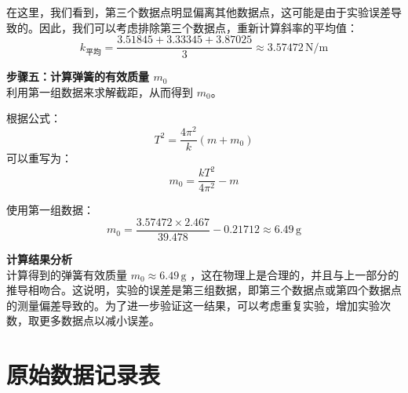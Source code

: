 \documentclass[zihao=5, UTF8]{article}
\theoremstyle{MyLineTheoremStyle} %
\theoremstyle{MyBlockTheoremStyle} %
\theoremstyle{MySubsubsectionStyle} %
\begin{document}
在这里，我们看到，第三个数据点明显偏离其他数据点，这可能是由于实验误差导致的。因此，我们可以考虑排除第三个数据点，重新计算斜率的平均值：
\[
k_{\text{平均}} = \frac{3.51845 + 3.33345 + 3.87025}{3} \approx 3.57472 \, \text{N/m}
\]

\textbf{步骤五：计算弹簧的有效质量 \( m_0 \)} \\
利用第一组数据来求解截距，从而得到 \( m_0 \)。

根据公式：
\[
T^2 = \frac{4\pi^2}{k}(m + m_0)
\]
可以重写为：
\[
m_0 = \frac{k T^2}{4\pi^2} - m
\]

使用第一组数据：
\[
m_0 = \frac{3.57472 \times 2.467}{39.478} - 0.21712 \approx  6.49 \, \text{g}
\]

\textbf{计算结果分析} \\
计算得到的弹簧有效质量 \( m_0 \approx 6.49 \, \text{g} \) ，这在物理上是合理的，并且与上一部分的推导相吻合。这说明，实验的误差是第三组数据，即第三个数据点或第四个数据点的测量偏差导致的。为了进一步验证这一结果，可以考虑重复实验，增加实验次数，取更多数据点以减小误差。

\section{原始数据记录表}

\end{document}
